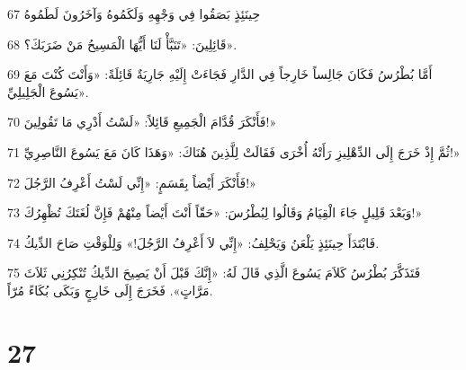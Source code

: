 \par 67 حِينَئِذٍ بَصَقُوا فِي وَجْهِهِ وَلَكَمُوهُ وَآخَرُونَ لَطَمُوهُ
\par 68 قَائِلِينَ: «تَنَبَّأْ لَنَا أَيُّهَا الْمَسِيحُ مَنْ ضَرَبَكَ؟».
\par 69 أَمَّا بُطْرُسُ فَكَانَ جَالِساً خَارِجاً فِي الدَّارِ فَجَاءَتْ إِلَيْهِ جَارِيَةٌ قَائِلَةً: «وَأَنْتَ كُنْتَ مَعَ يَسُوعَ الْجَلِيلِيِّ».
\par 70 فَأَنْكَرَ قُدَّامَ الْجَمِيعِ قَائِلاً: «لَسْتُ أَدْرِي مَا تَقُولِينَ!»
\par 71 ثُمَّ إِذْ خَرَجَ إِلَى الدِّهْلِيزِ رَأَتْهُ أُخْرَى فَقَالَتْ لِلَّذِينَ هُنَاكَ: «وَهَذَا كَانَ مَعَ يَسُوعَ النَّاصِرِيِّ!»
\par 72 فَأَنْكَرَ أَيْضاً بِقَسَمٍ: «إِنِّي لَسْتُ أَعْرِفُ الرَّجُلَ!»
\par 73 وَبَعْدَ قَلِيلٍ جَاءَ الْقِيَامُ وَقَالُوا لِبُطْرُسَ: «حَقّاً أَنْتَ أَيْضاً مِنْهُمْ فَإِنَّ لُغَتَكَ تُظْهِرُكَ!»
\par 74 فَابْتَدَأَ حِينَئِذٍ يَلْعَنُ وَيَحْلِفُ: «إِنِّي لاَ أَعْرِفُ الرَّجُلَ!» وَلِلْوَقْتِ صَاحَ الدِّيكُ.
\par 75 فَتَذَكَّرَ بُطْرُسُ كَلاَمَ يَسُوعَ الَّذِي قَالَ لَهُ: «إِنَّكَ قَبْلَ أَنْ يَصِيحَ الدِّيكُ تُنْكِرُنِي ثَلاَثَ مَرَّاتٍ». فَخَرَجَ إِلَى خَارِجٍ وَبَكَى بُكَاءً مُرّاً.

\chapter{27}

